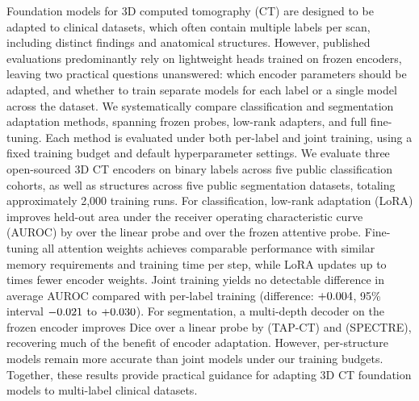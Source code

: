 Foundation models for 3D computed tomography (CT) are designed to be adapted to clinical datasets, which often contain multiple labels per scan, including distinct findings and anatomical structures. However, published evaluations predominantly rely on lightweight heads trained on frozen encoders, leaving two practical questions unanswered: which encoder parameters should be adapted, and whether to train separate models for each label or a single model across the dataset. We systematically compare \numClsMethodsN{} classification and \numSegMethodsN{} segmentation adaptation methods, spanning frozen probes, low-rank adapters, and full fine-tuning. Each method is evaluated under both per-label and joint training, using a fixed training budget and default hyperparameter settings. We evaluate three open-sourced 3D CT encoders on \numLabelsN{} binary labels across five public classification cohorts, as well as \numStructuresN{} structures across five public segmentation datasets, totaling approximately 2,000 training runs. For classification, low-rank adaptation (LoRA) improves held-out area under the receiver operating characteristic curve (AUROC) by \magn{\numCiClsloralinAllMeandiff} over the linear probe and \magn{\numCiClsloraattnAllMeandiff} over the frozen attentive probe. Fine-tuning all attention weights achieves comparable performance with similar memory requirements and training time per step, while LoRA updates up to \numParamsratioSpectreAttnftLora{} times fewer encoder weights. Joint training yields no detectable difference in average AUROC compared with per-label training (difference: $+0.004$, 95\% interval $-0.021$ to $+0.030$). For segmentation, a multi-depth decoder on the frozen encoder improves Dice over a linear probe by \magn{\numSegdeltaTapctLinDecMeandiff} (TAP-CT) and \magn{\numSegdeltaSpectreLinDecMeandiff} (SPECTRE), recovering much of the benefit of encoder adaptation. However, per-structure models remain more accurate than joint models under our training budgets. Together, these results provide practical guidance for adapting 3D CT foundation models to multi-label clinical datasets.

